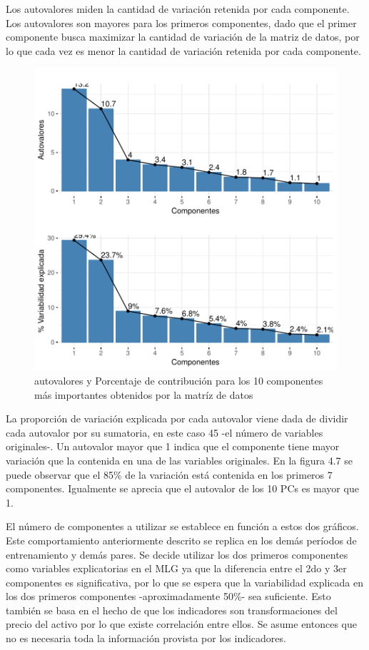 \documentclass[a4paper,12pt]{Latex/Classes/PhDthesisPSnPDF}
\begin{document}
Los autovalores miden la cantidad de variación retenida por cada componente. Los autovalores son mayores para los primeros componentes, dado que el primer componente busca maximizar la cantidad de variación de la matriz de datos, por lo que cada vez es menor la cantidad de variación retenida por cada componente.

\begin{figure}[H]
\centering
\includegraphics{main-013}
\caption{autovalores y Porcentaje de contribución para los 10 componentes más importantes obtenidos por la matríz de datos}
\end{figure}

La proporción de variación explicada por cada autovalor viene dada de dividir cada autovalor por su sumatoria, en este caso 45 -el número de variables originales-. Un autovalor mayor que 1 indica que el componente tiene mayor variación que la contenida en una de las variables originales. En la figura 4.7 se puede observar que el 85\% de la variación está contenida en los primeros 7 componentes. Igualmente se aprecia que el autovalor de los 10 PCs es mayor que 1. 

El número de componentes a utilizar se establece en función a estos dos gráficos. Este comportamiento anteriormente descrito se replica en los demás períodos de entrenamiento y demás pares. Se decide utilizar los dos primeros componentes como variables explicatorias en el MLG ya que la diferencia entre el 2do y 3er componentes es significativa, por lo que se espera que la variabilidad explicada en los dos primeros componentes -aproximadamente 50\%- sea suficiente. Esto también se basa en el hecho de que los indicadores son transformaciones del precio del activo por lo que existe correlación entre ellos. Se asume entonces que no es necesaria toda la información provista por los indicadores.
\end{document}
